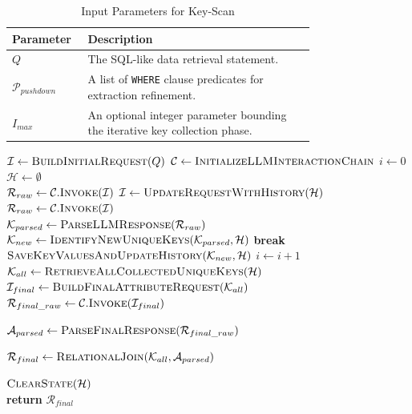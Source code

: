 \begin{table}[H]
    \centering
    \begin{tabular}{|l|p{0.75\linewidth}|}
        \hline
        \textbf{Parameter} & \textbf{Description} \\
        \hline
        $Q$ & The SQL-like data retrieval statement. \\
        \hline
        $\mathcal{P}_{pushdown}$ & A list of \texttt{WHERE} clause predicates for extraction refinement. \\
        \hline
        $I_{max}$ & An optional integer parameter bounding the iterative key collection phase. \\
        \hline
    \end{tabular}
    \caption{Input Parameters for Key-Scan}
    \label{tab:key_scan_inputs}
\end{table}

\begin{algorithm}
\caption{Key-Scan Algorithm}
\label{alg:key_scan}
\begin{algorithmic}[1]
    \State $\mathcal{I} \gets \Call{BuildInitialRequest}{Q}$
    \State $\mathcal{C} \gets \Call{InitializeLLMInteractionChain}{}$
    \State $i \gets 0$
    \State $\mathcal{H} \gets \emptyset$
    \\
            \State $\mathcal{R}_{raw} \gets \mathcal{C}.\Call{Invoke}{\mathcal{I}}$
        \Else
            \State $\mathcal{I} \gets \Call{UpdateRequestWithHistory}{\mathcal{H}}$
            \State $\mathcal{R}_{raw} \gets \mathcal{C}.\Call{Invoke}{\mathcal{I}}$
        \EndIf
        \\
        \State $\mathcal{K}_{parsed} \gets \Call{ParseLLMResponse}{\mathcal{R}_{raw}}$
        \State $\mathcal{K}_{new} \gets \Call{IdentifyNewUniqueKeys}{\mathcal{K}_{parsed}, \mathcal{H}}$
            \State \textbf{break}
        \EndIf
        \\
        \State $\Call{SaveKeyValuesAndUpdateHistory}{\mathcal{K}_{new}, \mathcal{H}}$
        \State $i \gets i + 1$
    \EndWhile
    \\
    \State $\mathcal{K}_{all} \gets \Call{RetrieveAllCollectedUniqueKeys}{\mathcal{H}}$
    \State $\mathcal{I}_{final} \gets \Call{BuildFinalAttributeRequest}{\mathcal{K}_{all}}$
    \State $\mathcal{R}_{final\_raw} \gets \mathcal{C}.\Call{Invoke}{\mathcal{I}_{final}}$
    
    \State $\mathcal{A}_{parsed} \gets \Call{ParseFinalResponse}{\mathcal{R}_{final\_raw}}$
    
    \State $\mathcal{R}_{final} \gets \Call{RelationalJoin}{\mathcal{K}_{all}, \mathcal{A}_{parsed}}$
    
    \State $\Call{ClearState}{\mathcal{H}}$
    \\
    \State \textbf{return} $\mathcal{R}_{final}$
\EndFunction
\end{algorithmic}
\end{algorithm}

